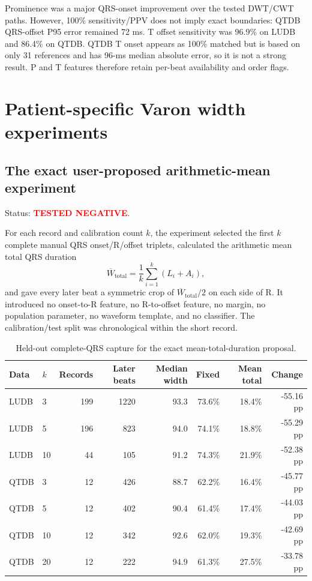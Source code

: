 \documentclass[11pt,a4paper]{article}
\newcommand{\testednegative}{\textcolor{red}{\textbf{TESTED NEGATIVE}}}
\begin{document}
Prominence was a major QRS-onset improvement over the tested DWT/CWT paths. However, 100\% sensitivity/PPV does not imply exact boundaries: QTDB QRS-offset P95 error remained 72 ms. T offset sensitivity was 96.9\% on LUDB and 86.4\% on QTDB. QTDB T onset appears as 100\% matched but is based on only 31 references and has 96-ms median absolute error, so it is not a strong result. P and T features therefore retain per-beat availability and order flags.

\section{Patient-specific Varon width experiments}
\label{sec:personalwidth}

\subsection{The exact user-proposed arithmetic-mean experiment}

Status: \testednegative.

For each record and calibration count $k$, the experiment selected the first $k$ complete manual QRS onset/R/offset triplets, calculated the arithmetic mean total QRS duration
\[
\overline{W}_{\mathrm{total}}=\frac{1}{k}\sum_{i=1}^{k}(L_i+A_i),
\]
and gave every later beat a symmetric crop of $\overline{W}_{\mathrm{total}}/2$ on each side of R. It introduced no onset-to-R feature, no R-to-offset feature, no margin, no population parameter, no waveform template, and no classifier. The calibration/test split was chronological within the short record.

\begin{table}[H]
\centering
\small
\caption{Held-out complete-QRS capture for the exact mean-total-duration proposal.}
\begin{tabular}{llrrrrrr}
\toprule
Data & $k$ & Records & Later beats & Median width & Fixed & Mean total & Change \\
\midrule
LUDB & 3 & 199 & 1220 & 93.3 & 73.6\% & 18.4\% & -55.16 pp \\
LUDB & 5 & 196 & 823 & 94.0 & 74.1\% & 18.8\% & -55.29 pp \\
LUDB & 10 & 44 & 105 & 91.2 & 74.3\% & 21.9\% & -52.38 pp \\
QTDB & 3 & 12 & 426 & 88.7 & 62.2\% & 16.4\% & -45.77 pp \\
QTDB & 5 & 12 & 402 & 90.4 & 61.4\% & 17.4\% & -44.03 pp \\
QTDB & 10 & 12 & 342 & 92.6 & 62.0\% & 19.3\% & -42.69 pp \\
QTDB & 20 & 12 & 222 & 94.9 & 61.3\% & 27.5\% & -33.78 pp \\
\bottomrule
\end{tabular}
\end{table}
\end{document}
